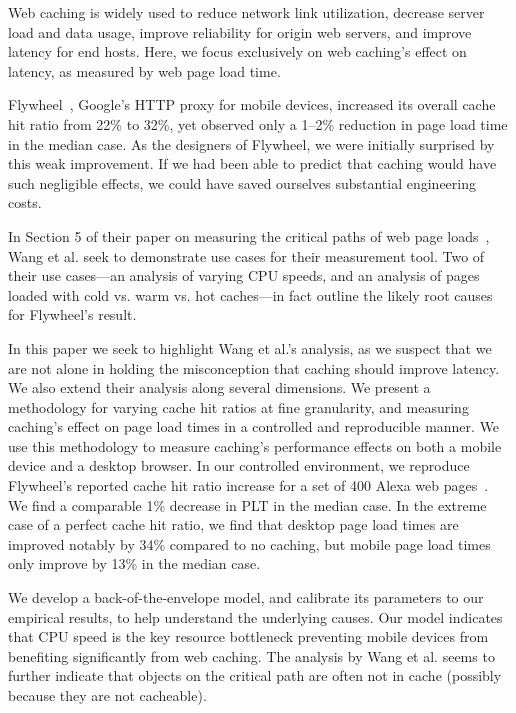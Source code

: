 \label{intro}
Web caching is widely used to reduce network link utilization, decrease server load and data usage, improve reliability for origin web servers, and improve latency for end hosts.
Here, we focus exclusively on web caching's effect on latency, as measured by web page load time.

Flywheel~\cite{flywheel}, Google's HTTP proxy for mobile devices, increased
its overall cache hit ratio from 22\% to 32\%, yet observed only a 1--2\% reduction in page load time in the median case.
As the designers of Flywheel, we were initially surprised by this weak
improvement. If we had been able to predict that caching would have such
negligible effects, we could have saved ourselves substantial engineering costs. %

In Section 5 of their paper on measuring the critical paths of web page 
loads~\cite{wang2013demystifying}, Wang et al. seek to demonstrate use 
cases for their measurement tool. Two of their use cases---an analysis of
varying CPU speeds, and an analysis of pages loaded with cold vs. warm vs. hot caches---in fact outline the likely root causes for Flywheel's result.

In this paper we seek to highlight Wang et al.'s analysis, as we suspect that
we are not alone in holding the misconception that caching should
improve latency. We also extend
their analysis along several dimensions. We present 
a methodology for varying cache hit ratios at fine granularity,
and measuring caching's effect on page load times in a controlled and 
reproducible manner.
We use this methodology to measure caching's performance effects on both a mobile device and a desktop browser.
In our controlled environment, we reproduce Flywheel's reported cache hit
ratio increase for
a set of
400 Alexa web pages~\cite{alexa}. We find a comparable 1\% decrease in PLT in the median
case.
In the extreme case of a perfect cache hit ratio, we find that desktop page load times are improved notably by 34\% compared to no caching, but mobile page load times only improve by 13\% in the median case.

We develop a back-of-the-envelope model, and calibrate its parameters to
our empirical results, to help understand the underlying causes.
Our model indicates that CPU speed is the key resource bottleneck preventing mobile devices from benefiting significantly from web caching. 
The analysis by Wang et al. seems to further indicate that objects on the critical path are often not in cache (possibly because they are not cacheable).

